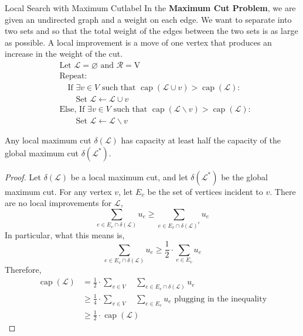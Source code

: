 \begin{ex}{Local Search with Maximum Cut}{label}
	In the \textbf{Maximum Cut Problem}, we are given an undirected graph  and a weight  on each edge. We want to separate  into two sets  and  so that the total weight of the edges between the two sets is as large as possible. A local improvement is a move of one vertex that produces an increase in the weight of the cut.
	\begin{align*}
		&\text{Let $\mathcal{L}=\varnothing$ and $\mathcal{R}=\mathrm{V}$} \\
		&\text{Repeat:} \\
		&\quad \text{If $\exists v \in V$ such that $\operatorname{cap}(\mathcal{L} \cup v)>\operatorname{cap}(\mathcal{L}):$} \\
		&\quad\quad \text{Set $\mathcal{L} \longleftarrow \mathcal{L} \cup v$} \\
		&\text{Else, If $\exists v \in V$ such that $\operatorname{cap}(\mathcal{L} \backslash v)>\operatorname{cap}(\mathcal{L}):$}\\
		&\quad\quad\text{Set $\mathcal{L} \leftarrow \mathcal{L} \backslash v$}
	\end{align*}

	\begin{thm}
		Any local maximum cut $\delta(\mathcal{L})$ has capacity at least half the capacity of the global maximum cut $\delta(\mathcal{L^*})$.
	\end{thm}

	\begin{proof}
		Let $\delta(\mathcal{L})$ be a local maximum cut, and let $\delta(\mathcal{L^*})$ be the global maximum cut. For any vertex $v$, let $E_v$ be the set of vertices incident to $v$. There are no local improvements for $\mathcal{L}$,
		\[\sum_{e \in E_{v} \cap \delta(\mathcal{L})} u_{e} \geq \sum_{e \in E_{v} \cap \delta(\mathcal{L})^c} u_{e}\]
		In particular, what this means is,
		\[\sum_{e \in E_{v} \cap \delta(\mathcal{L})} u_{e} \geq \frac{1}{2} \cdot \sum_{e \in E_{v}} u_{e}\]
		Therefore,
		\begin{align*}
			\operatorname{cap}(\mathcal{L})&=\frac{1}{2} \cdot \sum_{v \in V} \quad \sum_{e \in E_{v} \cap \delta(\mathcal{L})} u_{e} \\
			&\geq \frac{1}{4} \cdot \sum_{v \in V} \quad \sum_{e \in E_{v}} u_{e} \text{ plugging in the inequality} \\
			&\geq \frac{1}{2} \cdot \operatorname{cap}(\mathcal{L})
		\end{align*}
	\end{proof}
\end{ex}


